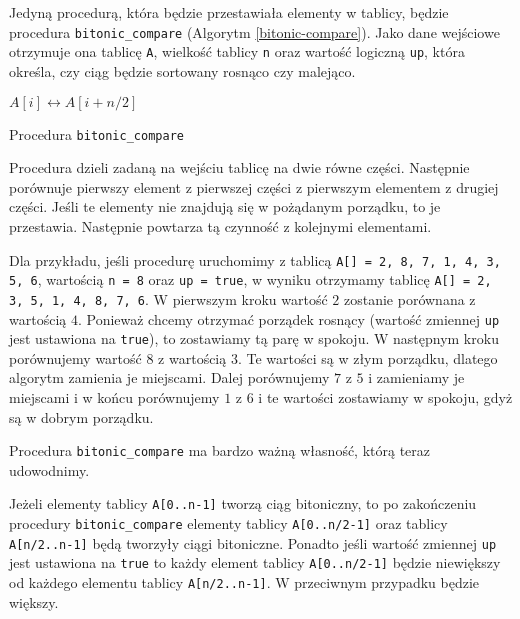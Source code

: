Jedyną procedurą, która będzie przestawiała elementy w tablicy, będzie procedura \texttt{bitonic\_compare} (Algorytm \ref{bitonic-compare}).
Jako dane wejściowe otrzymuje ona tablicę \texttt{A}, wielkość tablicy \texttt{n} oraz wartość logiczną \texttt{up}, która określa, czy ciąg będzie sortowany rosnąco czy malejąco.
\begin{algorithm}[h]
  \DontPrintSemicolon

  
  {
    {
      $A[i] \leftrightarrow A[i+n/2]$\;
    }
  }
  \caption{Procedura \texttt{bitonic\_compare}}
  \label{bitonic-compare}
\end{algorithm}
Procedura dzieli zadaną na wejściu tablicę na dwie równe części.
Następnie porównuje pierwszy element z pierwszej części z pierwszym elementem z drugiej części.
Jeśli te elementy nie znajdują się w pożądanym porządku, to je przestawia.
Następnie powtarza tą czynność z kolejnymi elementami.

Dla przykładu, jeśli procedurę uruchomimy z tablicą \texttt{A[] = 2, 8, 7, 1, 4, 3, 5, 6}, wartością \texttt{n = 8} oraz \texttt{up = true}, w wyniku otrzymamy tablicę \texttt{A[] = 2, 3, 5, 1, 4, 8, 7, 6}.
W pierwszym kroku wartość $2$ zostanie porównana z wartością $4$.
Ponieważ chcemy otrzymać porządek rosnący (wartość zmiennej \texttt{up} jest ustawiona na \texttt{true}), to zostawiamy tą parę w spokoju.
W następnym kroku porównujemy wartość $8$ z wartością $3$.
Te wartości są w złym porządku, dlatego algorytm zamienia je miejscami.
Dalej porównujemy $7$ z $5$ i zamieniamy je miejscami i w końcu porównujemy $1$ z $6$ i te wartości zostawiamy w spokoju, gdyż są w dobrym porządku.

Procedura \texttt{bitonic\_compare} ma bardzo ważną własność, którą teraz udowodnimy.

\begin{theorem}
 Jeżeli elementy tablicy \texttt{A[0..n-1]} tworzą ciąg bitoniczny, to po zakończeniu procedury \texttt{bitonic\_compare} elementy tablicy \texttt{A[0..n/2-1]} oraz tablicy \texttt{A[n/2..n-1]} będą tworzyły ciągi bitoniczne.
 Ponadto jeśli wartość zmiennej \texttt{up} jest ustawiona na \texttt{true} to każdy element tablicy \texttt{A[0..n/2-1]} będzie niewiększy od każdego elementu tablicy \texttt{A[n/2..n-1]}.
 W przeciwnym przypadku będzie większy.
 \label{bitonic-theorem}
\end{theorem}

